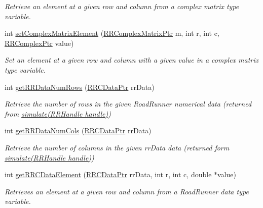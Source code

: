 \begin{DoxyCompactItemize}
\begin{DoxyCompactList}\small\item\em Retrieve an element at a given row and column from a complex matrix type variable. \end{DoxyCompactList}\item 
int \hyperlink{group__helper_routines_gae1bbe8ffdf12455a6c037b4da2c05936}{set\+Complex\+Matrix\+Element} (\hyperlink{rrc__types_8h_a8cf9e865d8541d100f153800adbb7c3f}{R\+R\+Complex\+Matrix\+Ptr} m, int r, int c, \hyperlink{rrc__types_8h_ada2046d7326c56ae29d8510fbf6622ee}{R\+R\+Complex\+Ptr} value)
\begin{DoxyCompactList}\small\item\em Set an element at a given row and column with a given value in a complex matrix type variable. \end{DoxyCompactList}\item 
int \hyperlink{group__helper_routines_ga0309b51e111e53ee0131d88c118eb260}{get\+R\+R\+Data\+Num\+Rows} (\hyperlink{rrc__types_8h_a9da8b124eb9c3c0045f8926c6a420b4a}{R\+R\+C\+Data\+Ptr} rr\+Data)
\begin{DoxyCompactList}\small\item\em Retrieve the number of rows in the given Road\+Runner numerical data (returned from \hyperlink{group__simulation_ga55c9ef1913377542f61d1d622911cc7b}{simulate(\+R\+R\+Handle handle)}) \end{DoxyCompactList}\item 
int \hyperlink{group__helper_routines_ga94531f474b344dd40357ceb516aef46c}{get\+R\+R\+Data\+Num\+Cols} (\hyperlink{rrc__types_8h_a9da8b124eb9c3c0045f8926c6a420b4a}{R\+R\+C\+Data\+Ptr} rr\+Data)
\begin{DoxyCompactList}\small\item\em Retrieve the number of columns in the given rr\+Data data (returned form \hyperlink{group__simulation_ga55c9ef1913377542f61d1d622911cc7b}{simulate(\+R\+R\+Handle handle)}) \end{DoxyCompactList}\item 
int \hyperlink{group__helper_routines_ga14de5fa09708f9ca8c73cc577b18f6ee}{get\+R\+R\+C\+Data\+Element} (\hyperlink{rrc__types_8h_a9da8b124eb9c3c0045f8926c6a420b4a}{R\+R\+C\+Data\+Ptr} rr\+Data, int r, int c, double $\ast$value)
\begin{DoxyCompactList}\small\item\em Retrieves an element at a given row and column from a Road\+Runner data type variable. \end{DoxyCompactList}\item 

\end{DoxyCompactItemize}
